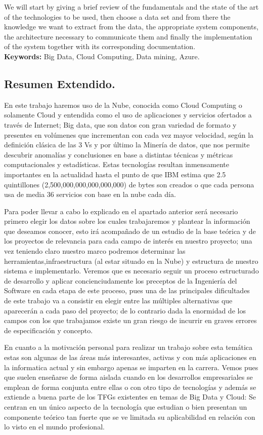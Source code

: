 \documentclass[11pt, a4paper]{article} %
\begin{document}
We will start by giving a brief review of the fundamentals and the state of the art of the technologies to be used, then choose a data set and from there the knowledge we want to extract from the data, the appropriate system components, the architecture necessary to communicate them and finally the implementation of the system together with its corresponding documentation.
\vspace{1cm} \ \\
\textbf{Keywords:} Big Data, Cloud Computing, Data mining, Azure.

\newpage
\subsection{Resumen Extendido.}
En este trabajo haremos uso de la Nube, conocida como Cloud Computing o solamente Cloud y entendida como el uso de aplicaciones y servicios ofertados a través de Internet; Big data, que son datos con gran variedad de formato y presentes en volúmenes que incrementan con cada vez mayor velocidad, según la definición clásica de las 3 Vs y por último la Minería de datos, que nos permite descubrir anomalías y conclusiones en base a distintas técnicas y métricas computacionales y estadísticas. Estas tecnologías resultan inmensamente importantes en la actualidad hasta el punto de que IBM estima que 2.5 quintillones (2,500,000,000,000,000,000) de bytes son creados o que cada persona usa de media 36 servicios con base en la nube cada día. \cite{bigdataoracle} 


Para poder llevar a cabo lo explicado en el apartado anterior será necesario primero elegir los datos sobre los cuales trabajaremos y plantear la información que deseamos conocer, esto irá acompañado de un estudio de la base teórica y de los proyectos de relevancia para cada campo de interés en nuestro proyecto; una vez teniendo claro nuestro marco podremos determinar las herramientas,infraestructura (al estar situado en la Nube) y estructura de nuestro sistema e implementarlo. Veremos que es necesario seguir un proceso estructurado de desarrollo y aplicar concienciudamente los preceptos de la Ingeniería del Software en cada etapa de este proceso, pues una de las principales dificultades de este trabajo va a consistir en elegir entre las múltiples alternativas que aparecerán a cada paso del proyecto; de lo contrario dada la enormidad de los campos con los que trabajamos existe un gran riesgo de incurrir en graves errores de especificación y concepto.


En cuanto a la motivación personal para realizar un trabajo sobre esta temática estas son algunas de las áreas más interesantes, activas y con más aplicaciones en la informatica actual y sin embargo apenas se imparten en la carrera. Vemos pues que suelen enseñarse de forma aislada cuando en los desarrollos empresariales se emplean de forma conjunta entre ellas o con otro tipo de tecnologías y además se extiende a buena parte de los TFGs existentes en temas de Big Data y Cloud: Se centran en un único aspecto de la tecnología que estudian o bien presentan un componente teórico tan fuerte que se ve limitada su aplicabilidad en relación con lo visto en el mundo profesional.
\end{document}
